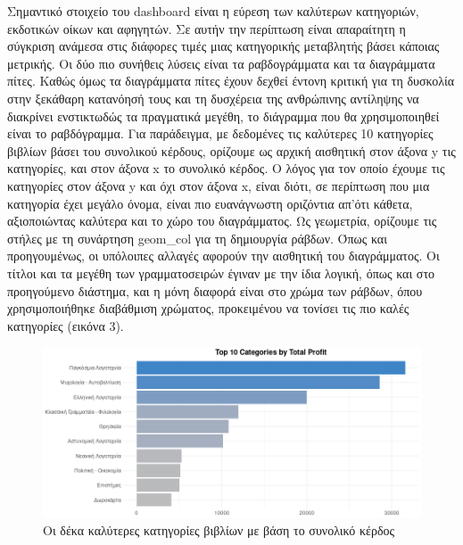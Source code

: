 \documentclass{article}
\begin{document}
Σημαντικό στοιχείο του dashboard είναι η εύρεση των καλύτερων κατηγοριών, εκδοτικών οίκων και αφηγητών. Σε αυτήν την περίπτωση είναι απαραίτητη η σύγκριση ανάμεσα στις διάφορες τιμές μιας κατηγορικής μεταβλητής βάσει κάποιας μετρικής. Οι δύο πιο συνήθεις λύσεις είναι τα ραβδογράμματα και τα διαγράμματα πίτες. Καθώς όμως τα διαγράμματα πίτες έχουν δεχθεί έντονη κριτική για τη δυσκολία στην ξεκάθαρη κατανόησή τους και τη δυσχέρεια της ανθρώπινης αντίληψης να διακρίνει ενστικτωδώς τα πραγματικά μεγέθη, το διάγραμμα που θα χρησιμοποιηθεί είναι το ραβδόγραμμα. Για παράδειγμα, με δεδομένες τις καλύτερες 10 κατηγορίες βιβλίων βάσει του συνολικού κέρδους, ορίζουμε ως αρχική αισθητική στον άξονα y τις κατηγορίες, και στον άξονα x το συνολικό κέρδος. Ο λόγος για τον οποίο έχουμε τις κατηγορίες στον άξονα y και όχι στον άξονα x, είναι διότι, σε περίπτωση που μια κατηγορία έχει μεγάλο όνομα, είναι πιο ευανάγνωστη οριζόντια απ’ότι κάθετα, αξιοποιώντας καλύτερα και το χώρο του διαγράμματος. Ως γεωμετρία, ορίζουμε τις στήλες με τη συνάρτηση geom\_col για τη δημιουργία ράβδων. Όπως και προηγουμένως, οι υπόλοιπες αλλαγές αφορούν την αισθητική του διαγράμματος. Οι τίτλοι και τα μεγέθη των γραμματοσειρών έγιναν με την ίδια λογική, όπως και στο προηγούμενο διάστημα, και η μόνη διαφορά είναι στο χρώμα των ράβδων, όπου χρησιμοποιήθηκε διαβάθμιση χρώματος, προκειμένου να τονίσει τις πιο καλές κατηγορίες (εικόνα 3).

\begin{figure}[h]
    \centering
    \includegraphics[width=\textwidth]{pictures/3_bar_graph.png}
    \caption{Οι δέκα καλύτερες κατηγορίες βιβλίων με βάση το συνολικό κέρδος}
    \label{fig:3}
\end{figure}
\end{document}
